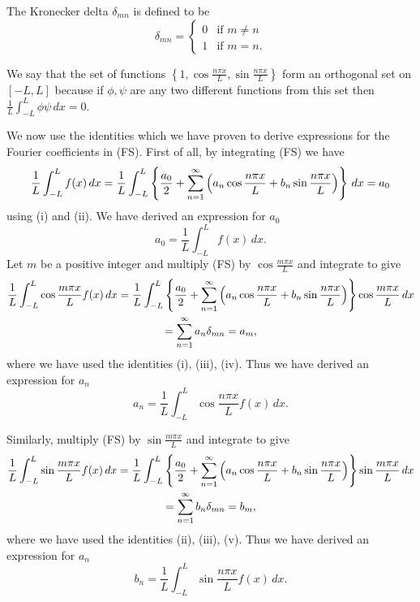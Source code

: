 \documentclass[10pt, a4paper]{article}
\begin{document}
The Kronecker delta $\delta_{mn}$ is defined to be
\[
\delta_{mn} = \begin{cases}
    0 & \text{if } m \neq n \\
    1 & \text{if } m = n.
\end{cases}
\]

We say that the set of functions $\left\{1, \cos{\frac{n\pi x}{L}}, \sin{\frac{n\pi x}{L}}\right\}$ form an orthogonal set on $[-L, L]$ because if $\phi, \psi$ are any two different functions from this set then $\frac{1}{L}\int_{-L}^{L}\phi\psi\,dx = 0$.

We now use the identities which we have proven to derive expressions for the Fourier coefficients in (FS).
First of all,
by integrating (FS) we have
\[
\frac{1}{L}\int_{-L}^{L}f(x)\,dx = \frac{1}{L}\int_{-L}^{L}\left\{\frac{a_0}{2} + \infsum[n = 1]\left(a_n\cos{\frac{n\pi x}{L}} + b_n\sin{\frac{n\pi x}{L}}\right)\right\}\,dx = a_0
\]
using (i) and (ii).
We have derived an expression for $a_0$
\[
a_0 = \frac{1}{L}\int_{-L}^{L}f(x)\,dx.
\]
Let $m$ be a positive integer and multiply (FS) by $\cos{\frac{m\pi x}{L}}$ and integrate to give
\begin{gather*}
    \frac{1}{L}\int_{-L}^{L}\cos{\frac{m\pi x}{L}}f(x)\,dx = \frac{1}{L}\int_{-L}^{L}\left\{\frac{a_0}{2} + \infsum[n = 1]\left(a_n\cos{\frac{n\pi x}{L}} + b_n\sin{\frac{n\pi x}{L}}\right)\right\}\cos{\frac{m\pi x}{L}}\,dx \\
    = \infsum[n = 1]a_n\delta_{mn} = a_m,
\end{gather*}
where we have used the identities (i),
(iii),
(iv).
Thus we have derived an expression for $a_n$
\[
a_n = \frac{1}{L}\int_{-L}^{L}\cos{\frac{n\pi x}{L}}f(x)\,dx.
\]

Similarly,
multiply (FS) by $\sin{\frac{m\pi x}{L}}$ and integrate to give
\begin{gather*}
    \frac{1}{L}\int_{-L}^{L}\sin{\frac{m\pi x}{L}}f(x)\,dx = \frac{1}{L}\int_{-L}^{L}\left\{\frac{a_0}{2} + \infsum[n = 1]\left(a_n\cos{\frac{n\pi x}{L}} + b_n\sin{\frac{n\pi x}{L}}\right)\right\}\sin{\frac{m\pi x}{L}}\,dx \\
    = \infsum[n = 1]b_n\delta_{mn} = b_m,
\end{gather*}
where we have used the identities (ii),
(iii),
(v).
Thus we have derived an expression for $a_n$
\[
b_n = \frac{1}{L}\int_{-L}^{L}\sin{\frac{n\pi x}{L}}f(x)\,dx.
\]
\end{document}
